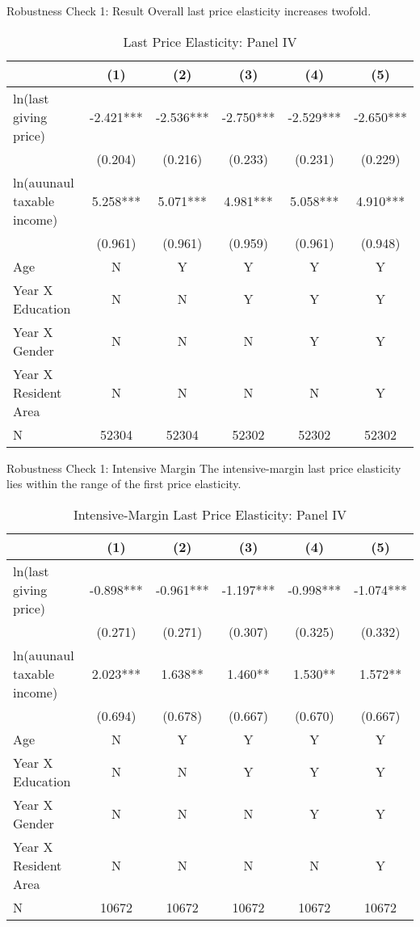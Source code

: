 \documentclass[
  ignorenonframetext,
]{beamer}
\begin{document}
\begin{frame}{Robustness Check 1: Result}
\protect\hypertarget{robustness-check-1-result}{}
Overall last price elasticity increases twofold.

\begin{table}

\caption{\label{tab:kableLastElasticity1}Last Price Elasticity: Panel IV}
\centering
\fontsize{7}{9}\selectfont
\begin{tabular}[t]{lccccc}
\toprule
 & (1) & (2) & (3) & (4) & (5)\\
\midrule
ln(last giving price) & -2.421*** & -2.536*** & -2.750*** & -2.529*** & -2.650***\\
 & (0.204) & (0.216) & (0.233) & (0.231) & (0.229)\\
ln(auunaul taxable income) & 5.258*** & 5.071*** & 4.981*** & 5.058*** & 4.910***\\
 & (0.961) & (0.961) & (0.959) & (0.961) & (0.948)\\
Age & N & Y & Y & Y & Y\\
Year X Education & N & N & Y & Y & Y\\
Year X Gender & N & N & N & Y & Y\\
Year X Resident Area & N & N & N & N & Y\\
N & 52304 & 52304 & 52302 & 52302 & 52302\\
\bottomrule
\end{tabular}
\end{table}
\end{frame}

\begin{frame}{Robustness Check 1: Intensive Margin}
\protect\hypertarget{robustness-check-1-intensive-margin}{}
The intensive-margin last price elasticity lies within the range of the first price elasticity.

\begin{table}

\caption{\label{tab:kableLastElasticity2Slide1}Intensive-Margin Last Price Elasticity: Panel IV}
\centering
\fontsize{7}{9}\selectfont
\begin{tabular}[t]{lccccc}
\toprule
 & (1) & (2) & (3) & (4) & (5)\\
\midrule
ln(last giving price) & -0.898*** & -0.961*** & -1.197*** & -0.998*** & -1.074***\\
 & (0.271) & (0.271) & (0.307) & (0.325) & (0.332)\\
ln(auunaul taxable income) & 2.023*** & 1.638** & 1.460** & 1.530** & 1.572**\\
 & (0.694) & (0.678) & (0.667) & (0.670) & (0.667)\\
Age & N & Y & Y & Y & Y\\
Year X Education & N & N & Y & Y & Y\\
Year X Gender & N & N & N & Y & Y\\
Year X Resident Area & N & N & N & N & Y\\
N & 10672 & 10672 & 10672 & 10672 & 10672\\
\bottomrule
\end{tabular}
\end{table}
\end{frame}
\end{document}
